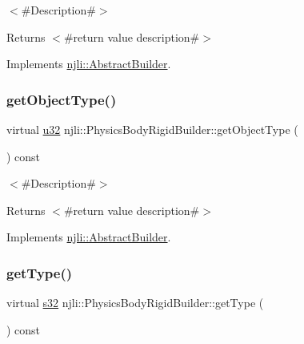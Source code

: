 $<$\#\+Description\#$>$

\begin{DoxyReturn}{Returns}
$<$\#return value description\#$>$ 
\end{DoxyReturn}


Implements \mbox{\hyperlink{classnjli_1_1_abstract_builder_a902f73ea78031b06aca183a417f3413b}{njli\+::\+Abstract\+Builder}}.

\mbox{\label{classnjli_1_1_physics_body_rigid_builder_a18ff621e12eaa333c1af3cebfd1f6cec}} 
\subsubsection{\texorpdfstring{get\+Object\+Type()}{getObjectType()}}
{\footnotesize\ttfamily virtual \mbox{\hyperlink{_util_8h_a10e94b422ef0c20dcdec20d31a1f5049}{u32}} njli\+::\+Physics\+Body\+Rigid\+Builder\+::get\+Object\+Type (\begin{DoxyParamCaption}{ }\end{DoxyParamCaption}) const\hspace{0.3cm}{\ttfamily [virtual]}}

$<$\#\+Description\#$>$

\begin{DoxyReturn}{Returns}
$<$\#return value description\#$>$ 
\end{DoxyReturn}


Implements \mbox{\hyperlink{classnjli_1_1_abstract_builder_a0f2d344fcf697b167f4f2b1122b5fb33}{njli\+::\+Abstract\+Builder}}.

\mbox{\label{classnjli_1_1_physics_body_rigid_builder_a430f133dad8c0c7deb350b510bc0e6de}} 
\subsubsection{\texorpdfstring{get\+Type()}{getType()}}
{\footnotesize\ttfamily virtual \mbox{\hyperlink{_util_8h_aa62c75d314a0d1f37f79c4b73b2292e2}{s32}} njli\+::\+Physics\+Body\+Rigid\+Builder\+::get\+Type (\begin{DoxyParamCaption}{ }\end{DoxyParamCaption}) const\hspace{0.3cm}{\ttfamily [virtual]}}

